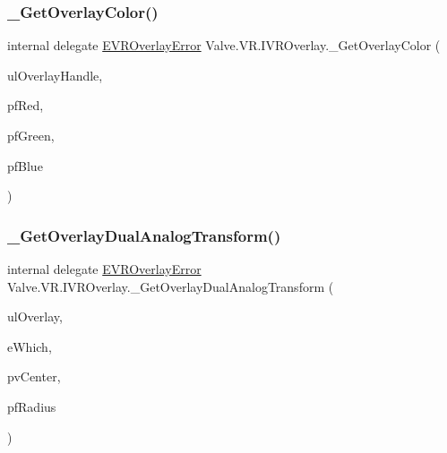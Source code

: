 \subsubsection{\texorpdfstring{\_GetOverlayColor()}{\_GetOverlayColor()}}
{\footnotesize\ttfamily internal delegate \mbox{\hyperlink{namespace_valve_1_1_v_r_aaee5c5144f42b7969d45b854f51b0c18}{E\+V\+R\+Overlay\+Error}} Valve.\+V\+R.\+I\+V\+R\+Overlay.\+\_\+\+Get\+Overlay\+Color (\begin{DoxyParamCaption}\item[{ulong}]{ul\+Overlay\+Handle,  }\item[{ref float}]{pf\+Red,  }\item[{ref float}]{pf\+Green,  }\item[{ref float}]{pf\+Blue }\end{DoxyParamCaption})}

\mbox{\label{struct_valve_1_1_v_r_1_1_i_v_r_overlay_a9c8eb4e102476da54755cc70340f4c48}} 
\subsubsection{\texorpdfstring{\_GetOverlayDualAnalogTransform()}{\_GetOverlayDualAnalogTransform()}}
{\footnotesize\ttfamily internal delegate \mbox{\hyperlink{namespace_valve_1_1_v_r_aaee5c5144f42b7969d45b854f51b0c18}{E\+V\+R\+Overlay\+Error}} Valve.\+V\+R.\+I\+V\+R\+Overlay.\+\_\+\+Get\+Overlay\+Dual\+Analog\+Transform (\begin{DoxyParamCaption}\item[{ulong}]{ul\+Overlay,  }\item[{\mbox{\hyperlink{namespace_valve_1_1_v_r_a3a5fe210bea8b993a1ad42f680119e90}{E\+Dual\+Analog\+Which}}}]{e\+Which,  }\item[{ref \mbox{\hyperlink{struct_valve_1_1_v_r_1_1_hmd_vector2__t}{Hmd\+Vector2\+\_\+t}}}]{pv\+Center,  }\item[{ref float}]{pf\+Radius }\end{DoxyParamCaption})}

\mbox{\label{struct_valve_1_1_v_r_1_1_i_v_r_overlay_a55f8c3483bb8a333ac58781e174bde62}} 
